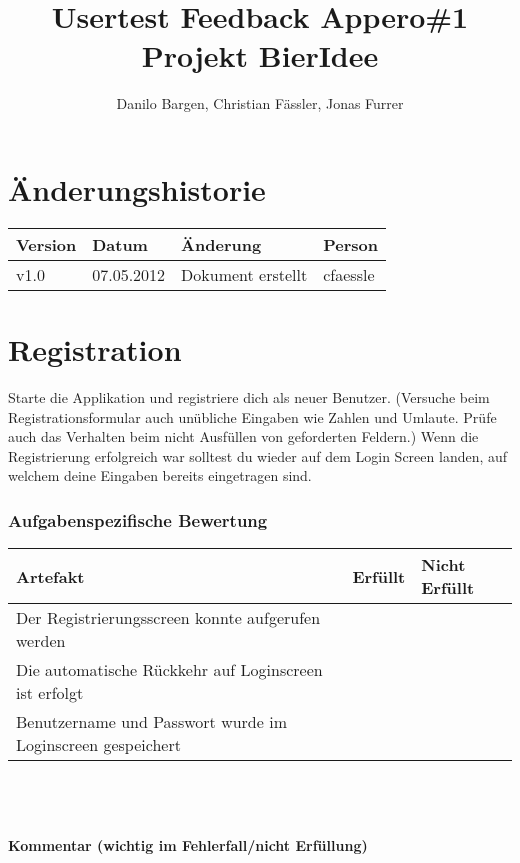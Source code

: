 \documentclass[10pt,a4paper]{scrartcl}
\author{Danilo Bargen, Christian Fässler, Jonas Furrer}
\title{Usertest Feedback Appero\#1\\ Projekt BierIdee}
\begin{document}
\begin{titlepage}
	\maketitle
	\vspace{120mm}
	\thispagestyle{empty} %
\end{titlepage}

\tableofcontents
\newpage

\section*{Änderungshistorie}
\begin{tabular}{p{}p{}p{}p{}}
\toprule
\textbf{Version} & \textbf{Datum} & \textbf{Änderung} & \textbf{Person} \\  
\midrule
v1.0 & 07.05.2012 & Dokument erstellt & cfaessle \\  
\hline 
\bottomrule
\end{tabular} 
\newpage

\section{Registration}
Starte die Applikation und registriere dich als neuer Benutzer. 
(Versuche beim Registrationsformular auch unübliche Eingaben wie Zahlen und Umlaute. Prüfe auch das Verhalten beim nicht Ausfüllen von geforderten Feldern.)
Wenn die Registrierung erfolgreich war solltest du wieder auf dem Login Screen landen, auf welchem deine Eingaben bereits eingetragen sind.

\subsubsection*{Aufgabenspezifische Bewertung}
\begin{tabular}{|p{}|p{}|p{}|}
\hline 
\textbf{Artefakt} & \textbf{Erfüllt} & \textbf{Nicht Erfüllt} \\ 
\hline 
Der Registrierungsscreen konnte aufgerufen werden &  &  \\ 
\hline 
Die automatische Rückkehr auf Loginscreen ist erfolgt &  &  \\ 
\hline 
Benutzername und Passwort wurde im Loginscreen gespeichert &  &  \\ 
\hline 
\end{tabular}
\\
\\
\\
\textbf{Kommentar (wichtig im Fehlerfall/nicht Erfüllung)}
\vspace*{4cm}
\end{document}
